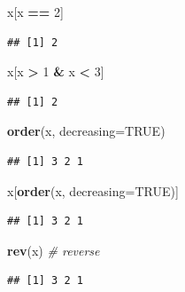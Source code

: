 \documentclass[12pt,]{book}
\newenvironment{Shaded}{\begin{snugshade}}{\end{snugshade}}
\newcommand{\CommentTok}[1]{\textcolor[rgb]{0.56,0.35,0.01}{\textit{#1}}}
\newcommand{\DataTypeTok}[1]{\textcolor[rgb]{0.13,0.29,0.53}{#1}}
\newcommand{\DecValTok}[1]{\textcolor[rgb]{0.00,0.00,0.81}{#1}}
\newcommand{\KeywordTok}[1]{\textcolor[rgb]{0.13,0.29,0.53}{\textbf{#1}}}
\newcommand{\NormalTok}[1]{#1}
\newcommand{\OperatorTok}[1]{\textcolor[rgb]{0.81,0.36,0.00}{\textbf{#1}}}
\newcommand{\OtherTok}[1]{\textcolor[rgb]{0.56,0.35,0.01}{#1}}
\newcommand{\StringTok}[1]{\textcolor[rgb]{0.31,0.60,0.02}{#1}}
\begin{document}
\begin{Shaded}
\begin{Highlighting}[]
\NormalTok{x[x }\OperatorTok{==}\StringTok{ }\DecValTok{2}\NormalTok{]}
\end{Highlighting}
\end{Shaded}

\begin{verbatim}
## [1] 2
\end{verbatim}

\begin{Shaded}
\begin{Highlighting}[]
\NormalTok{x[x }\OperatorTok{>}\StringTok{ }\DecValTok{1} \OperatorTok{&}\StringTok{ }\NormalTok{x }\OperatorTok{<}\StringTok{ }\DecValTok{3}\NormalTok{]}
\end{Highlighting}
\end{Shaded}

\begin{verbatim}
## [1] 2
\end{verbatim}

\begin{Shaded}
\begin{Highlighting}[]
\KeywordTok{order}\NormalTok{(x, }\DataTypeTok{decreasing=}\OtherTok{TRUE}\NormalTok{)}
\end{Highlighting}
\end{Shaded}

\begin{verbatim}
## [1] 3 2 1
\end{verbatim}

\begin{Shaded}
\begin{Highlighting}[]
\NormalTok{x[}\KeywordTok{order}\NormalTok{(x, }\DataTypeTok{decreasing=}\OtherTok{TRUE}\NormalTok{)]}
\end{Highlighting}
\end{Shaded}

\begin{verbatim}
## [1] 3 2 1
\end{verbatim}

\begin{Shaded}
\begin{Highlighting}[]
\KeywordTok{rev}\NormalTok{(x) }\CommentTok{# reverse}
\end{Highlighting}
\end{Shaded}

\begin{verbatim}
## [1] 3 2 1
\end{verbatim}
\end{document}

